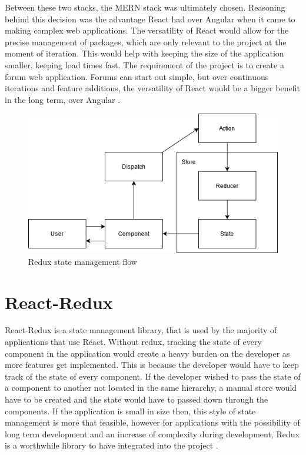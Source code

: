 Between these two stacks, the MERN stack was ultimately chosen. Reasoning behind this decision was the advantage React had over Angular when it came to making complex web applications. The versatility of React would allow for the precise management of packages, which are only relevant to the project at the moment of iteration. This would help with keeping the size of the application smaller, keeping load times fast. The requirement of the project is to create a forum web application. Forums can start out simple, but over continuous iterations and feature additions, the versatility of React would be a bigger benefit in the long term, over Angular \cite{reactangular}.

\begin{figure}
    \centering
    \includegraphics[scale=0.7]{img/redux.png}
    \caption{Redux state management flow}
    \label{fig3:redux}
\end{figure}

\section{React-Redux}
React-Redux is a state management library, that is used by the majority of applications that use React. Without redux, tracking the state of every component in the application would create a heavy burden on the developer as more features get implemented. This is because the developer would have to keep track of the state of every component. If the developer wished to pass the state of a component to another not located in the same hierarchy, a manual store would have to be created and the state would have to passed down through the components. If the application is small in size then, this style of state management is more that feasible, however for applications with the possibility of long term development and an increase of complexity during development, Redux is a worthwhile library to have integrated into the project \cite{reactredux}. 


